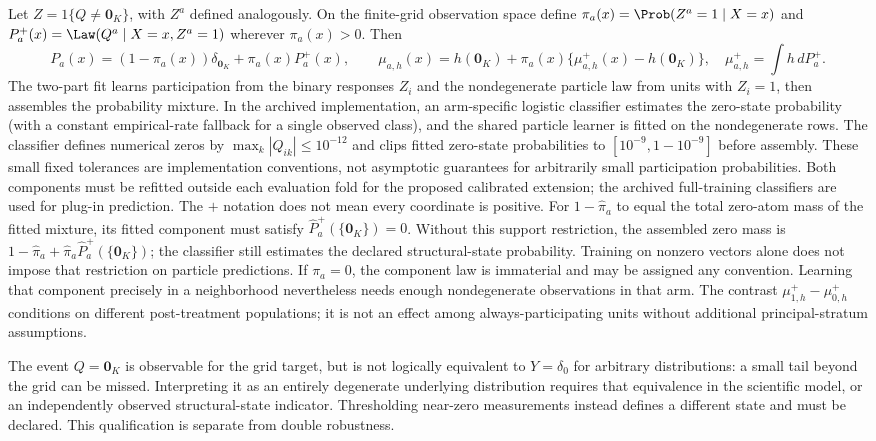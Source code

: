 Let $Z=1\{Q\neq\mathbf0_K\}$, with $Z^a$ defined analogously. On the finite-grid observation space define $\pi_a(x)=\Prob(Z^a=1\mid X=x)$ and $P_a^+(x)=\Law(Q^a\mid X=x,Z^a=1)$ wherever $\pi_a(x)>0$. Then
\[
 P_a(x)=(1-\pi_a(x))\delta_{\mathbf0_K}+\pi_a(x)P_a^+(x),\qquad
 \mu_{a,h}(x)=h(\mathbf0_K)+\pi_a(x)\{\mu_{a,h}^+(x)-h(\mathbf0_K)\},
 \quad \mu_{a,h}^+=\int h\,dP_a^+.
\]
The two-part fit learns participation from the binary responses $Z_i$ and the nondegenerate particle law from units with $Z_i=1$, then assembles the probability mixture. In the archived implementation, an arm-specific logistic classifier estimates the zero-state probability (with a constant empirical-rate fallback for a single observed class), and the shared particle learner is fitted on the nondegenerate rows. The classifier defines numerical zeros by $\max_k|Q_{ik}|\leq10^{-12}$ and clips fitted zero-state probabilities to $[10^{-9},1-10^{-9}]$ before assembly. These small fixed tolerances are implementation conventions, not asymptotic guarantees for arbitrarily small participation probabilities. Both components must be refitted outside each evaluation fold for the proposed calibrated extension; the archived full-training classifiers are used for plug-in prediction. The $+$ notation does not mean every coordinate is positive. For $1-\widehat\pi_a$ to equal the total zero-atom mass of the fitted mixture, its fitted component must satisfy $\widehat P_a^+(\{\mathbf0_K\})=0$. Without this support restriction, the assembled zero mass is $1-\widehat\pi_a+\widehat\pi_a\widehat P_a^+(\{\mathbf0_K\})$; the classifier still estimates the declared structural-state probability. Training on nonzero vectors alone does not impose that restriction on particle predictions. If $\pi_a=0$, the component law is immaterial and may be assigned any convention. Learning that component precisely in a neighborhood nevertheless needs enough nondegenerate observations in that arm. The contrast $\mu_{1,h}^+-\mu_{0,h}^+$ conditions on different post-treatment populations; it is not an effect among always-participating units without additional principal-stratum assumptions.

The event $Q=\mathbf0_K$ is observable for the grid target, but is not logically equivalent to $Y=\delta_0$ for arbitrary distributions: a small tail beyond the grid can be missed. Interpreting it as an entirely degenerate underlying distribution requires that equivalence in the scientific model, or an independently observed structural-state indicator. Thresholding near-zero measurements instead defines a different state and must be declared. This qualification is separate from double robustness.

